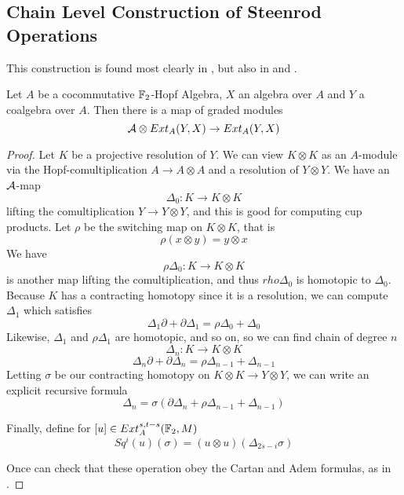 \subsection{Chain Level Construction of Steenrod Operations}
\label{sec:SteenrodConstruction}

This construction is found most clearly in \cite{kahnCupi}, but also in \cite{milgramGroupReps} and \cite{H00RingSpectra}.  

\begin{Theorem}
  Let $A$ be a cocommutative $\mathbb{F}_2$-Hopf Algebra, $X$ an algebra over $A$ and $Y$ a coalgebra over $A$.  
  Then there is a map of graded modules
  \[\mathcal{A}\otimes Ext_A(Y,X)\to Ext_A(Y,X)\]
\end{Theorem}

\begin{proof}
  Let $K$ be a projective resolution of $Y$.
  We can view $K\otimes K$ as an $A$-module via the Hopf-comultiplication $A\to A\otimes A$ and a resolution of $Y\otimes Y$.  
  We have an $\mathcal{A}$-map 
  \[\Delta_0:K\to K\otimes K\]
  lifting the comultiplication $Y\to Y\otimes Y$, and this is good for computing cup products. 
  Let $\rho$ be the switching map on $K\otimes K$, that is
  \[\rho (x\otimes y) = y\otimes x\]
  We have
  \[\rho\Delta_0 : K\to K\otimes K\]
  is another map lifting the comultiplication, and thus $rho\Delta_0$ is homotopic to $\Delta_0$.  
  Because $K$ has a contracting homotopy since it is a resolution, we can compute $\Delta_1$ which satisfies
  \[\Delta_1\partial + \partial\Delta_1 = \rho\Delta_0+\Delta_0\]
  Likewise, $\Delta_1$ and $\rho\Delta_1$ are homotopic, and so on, so we can find chain of degree $n$
  \[\Delta_n :K\to K\otimes K\]
  \[\Delta_n\partial + \partial\Delta_n = \rho\Delta_{n-1}+\Delta_{n-1}\]
  Letting $\sigma$ be our contracting homotopy on $K\otimes K\to Y\otimes Y$, we can write an explicit recursive formula
  \[\Delta_n = \sigma(\partial\Delta_n + \rho\Delta_{n-1}+\Delta_{n-1})\]
  
  Finally, define for $[u]\in Ext_A^{s,t-s}(\mathbb{F}_2,M)$
  \[Sq^i(u)(\sigma) = (u\otimes u)(\Delta_{2s-i}\sigma)\]

  Once can check that these operation obey the Cartan and Adem formulas, as in \cite{May_ageneral}.  
  
\end{proof}



